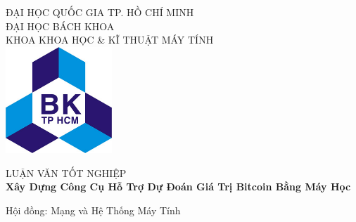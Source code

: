 


\begin{titlepage}

\newcommand{\HRule}{\rule{\linewidth}{0.5mm}} %

\center %
 

\textsc{\Large ĐẠI HỌC QUỐC GIA TP. HỒ CHÍ MINH}\\[0.25cm] %
\textsc{\Large ĐẠI HỌC BÁCH KHOA}\\[0.25cm] %
\textsc{\large KHOA KHOA HỌC \& KĨ THUẬT MÁY TÍNH}\\[0.4cm] %
\vspace{1cm}
\includegraphics[width=0.3\textwidth]{BK.jpg}\\[0.4cm]
\vspace{1cm}

\textsc{\Large{LUẬN VĂN TỐT NGHIỆP}}\\[0.5cm] 

{ \Large \bfseries Xây Dựng Công Cụ Hỗ Trợ Dự Đoán Giá Trị Bitcoin Bằng Máy Học}\\[0.7cm] %
\begin{flushright}
\vspace{1cm}
\large Hội đồng: Mạng và Hệ Thống Máy Tính
\end{flushright}
 


\end{titlepage}
